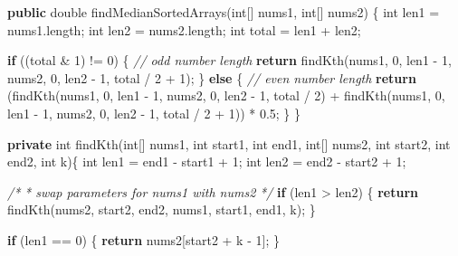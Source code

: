 \documentclass[]{book}
\newenvironment{Shaded}{\begin{snugshade}}{\end{snugshade}}
\newcommand{\CommentTok}[1]{\textcolor[rgb]{0.56,0.35,0.01}{\textit{#1}}}
\newcommand{\DataTypeTok}[1]{\textcolor[rgb]{0.13,0.29,0.53}{#1}}
\newcommand{\DecValTok}[1]{\textcolor[rgb]{0.00,0.00,0.81}{#1}}
\newcommand{\FloatTok}[1]{\textcolor[rgb]{0.00,0.00,0.81}{#1}}
\newcommand{\FunctionTok}[1]{\textcolor[rgb]{0.00,0.00,0.00}{#1}}
\newcommand{\KeywordTok}[1]{\textcolor[rgb]{0.13,0.29,0.53}{\textbf{#1}}}
\newcommand{\NormalTok}[1]{#1}
\begin{document}
\begin{Shaded}
\begin{Highlighting}[]
\KeywordTok{public} \DataTypeTok{double} \FunctionTok{findMedianSortedArrays}\NormalTok{(}\DataTypeTok{int}\NormalTok{[] nums1, }\DataTypeTok{int}\NormalTok{[] nums2) \{}
    \DataTypeTok{int}\NormalTok{ len1 = nums1.}\FunctionTok{length}\NormalTok{;}
    \DataTypeTok{int}\NormalTok{ len2 = nums2.}\FunctionTok{length}\NormalTok{;}
    \DataTypeTok{int}\NormalTok{ total = len1 + len2;}

    \KeywordTok{if}\NormalTok{ ((total & }\DecValTok{1}\NormalTok{) != }\DecValTok{0}\NormalTok{) \{}
        \CommentTok{// odd number length}
        \KeywordTok{return} \FunctionTok{findKth}\NormalTok{(nums1, }\DecValTok{0}\NormalTok{, len1 - }\DecValTok{1}\NormalTok{, nums2, }\DecValTok{0}\NormalTok{, len2 - }\DecValTok{1}\NormalTok{, total / }\DecValTok{2}\NormalTok{ + }\DecValTok{1}\NormalTok{);}
\NormalTok{    \} }\KeywordTok{else}\NormalTok{ \{}
        \CommentTok{// even number length}
        \KeywordTok{return}\NormalTok{ (}\FunctionTok{findKth}\NormalTok{(nums1, }\DecValTok{0}\NormalTok{, len1 - }\DecValTok{1}\NormalTok{, nums2, }\DecValTok{0}\NormalTok{, len2 - }\DecValTok{1}\NormalTok{, total / }\DecValTok{2}\NormalTok{) + }\FunctionTok{findKth}\NormalTok{(nums1, }\DecValTok{0}\NormalTok{, len1 - }\DecValTok{1}\NormalTok{, nums2, }\DecValTok{0}\NormalTok{, len2 - }\DecValTok{1}\NormalTok{, total / }\DecValTok{2}\NormalTok{ + }\DecValTok{1}\NormalTok{)) * }\FloatTok{0.5}\NormalTok{;}
\NormalTok{    \}}
\NormalTok{\}}

\KeywordTok{private} \DataTypeTok{int} \FunctionTok{findKth}\NormalTok{(}\DataTypeTok{int}\NormalTok{[] nums1, }\DataTypeTok{int}\NormalTok{ start1, }\DataTypeTok{int}\NormalTok{ end1, }\DataTypeTok{int}\NormalTok{[] nums2, }\DataTypeTok{int}\NormalTok{ start2, }\DataTypeTok{int}\NormalTok{ end2, }\DataTypeTok{int}\NormalTok{ k)\{}
    \DataTypeTok{int}\NormalTok{ len1 = end1 - start1 + }\DecValTok{1}\NormalTok{;}
    \DataTypeTok{int}\NormalTok{ len2 = end2 - start2 + }\DecValTok{1}\NormalTok{;}

    \CommentTok{/*}
\CommentTok{    * swap parameters for nums1 with nums2}
\CommentTok{    */}
    \KeywordTok{if}\NormalTok{ (len1 > len2) \{}
        \KeywordTok{return} \FunctionTok{findKth}\NormalTok{(nums2, start2, end2, nums1, start1, end1, k);}
\NormalTok{    \}}

    \KeywordTok{if}\NormalTok{ (len1 == }\DecValTok{0}\NormalTok{) \{}
        \KeywordTok{return}\NormalTok{ nums2[start2 + k - }\DecValTok{1}\NormalTok{];}
\NormalTok{    \}}


\end{Highlighting}
\end{Shaded}
\end{document}
